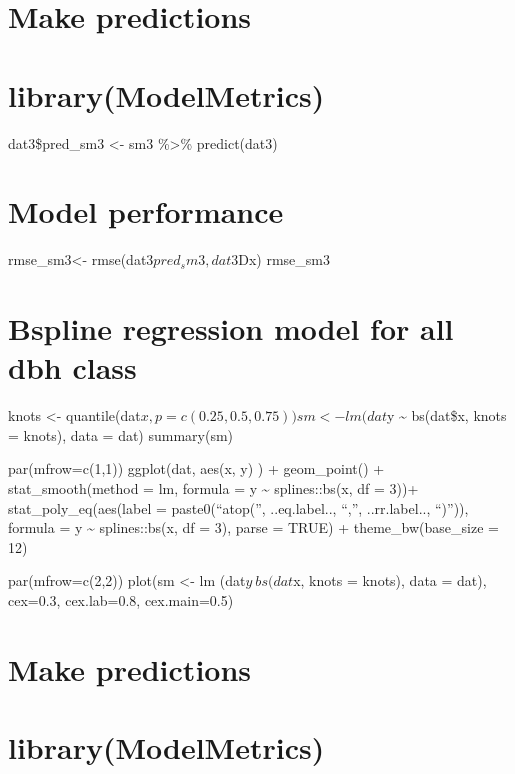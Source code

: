 \documentclass[
]{article}
\begin{document}
\hypertarget{make-predictions-8}{%
\section{Make predictions}\label{make-predictions-8}}

\hypertarget{librarymodelmetrics-8}{%
\section{library(ModelMetrics)}\label{librarymodelmetrics-8}}

dat3\$pred\_sm3 \textless- sm3 \%\textgreater\% predict(dat3)

\hypertarget{model-performance-2}{%
\section{Model performance}\label{model-performance-2}}

rmse\_sm3\textless- rmse(dat3\(pred_sm3, dat3\)Dx) rmse\_sm3

\hypertarget{bspline-regression-model-for-all-dbh-class}{%
\section{Bspline regression model for all dbh
class}\label{bspline-regression-model-for-all-dbh-class}}

knots \textless-
quantile(dat\(x, p = c(0.25, 0.5, 0.75)) sm <- lm (dat\)y
\textasciitilde{} bs(dat\$x, knots = knots), data = dat) summary(sm)

par(mfrow=c(1,1)) ggplot(dat, aes(x, y) ) + geom\_point() +
stat\_smooth(method = lm, formula = y \textasciitilde{} splines::bs(x,
df = 3))+ stat\_poly\_eq(aes(label = paste0(``atop('', ..eq.label..,
``,'', ..rr.label.., ``)'')), formula = y \textasciitilde{}
splines::bs(x, df = 3), parse = TRUE) + theme\_bw(base\_size = 12)

par(mfrow=c(2,2)) plot(sm \textless- lm (dat\(y ~ bs(dat\)x, knots =
knots), data = dat), cex=0.3, cex.lab=0.8, cex.main=0.5)

\hypertarget{make-predictions-9}{%
\section{Make predictions}\label{make-predictions-9}}

\hypertarget{librarymodelmetrics-9}{%
\section{library(ModelMetrics)}\label{librarymodelmetrics-9}}
\end{document}

